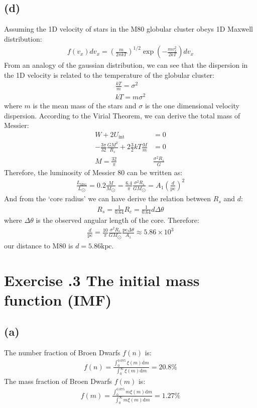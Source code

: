 \documentclass[a4paper,12pt]{article}
\renewcommand{\d}{\mathrm{d}}
\begin{document}
\subsection*{(d)}
Assuming the 1D velocity of stars in the M80 globular cluster obeys 1D Maxwell distribution:
\begin{align*}
    f(v_x)dv_x = (\frac{m}{2\pi kT})^{1/2} \exp(-\frac{m v_x^2}{2kT}) d v_x
\end{align*}
From an analogy of the gaussian distribution, we can see that the dispersion in the 1D velocity 
is related to the temperature of the globular cluster:
\begin{align*}
    \frac{kT}{m} = \sigma^2 \\
    kT = m \sigma^2
\end{align*}
where $m$ is the mean mass of the stars and $\sigma$ is the one dimensional velocity dispersion.
According to the Virial Theorem, we can derive the total mass of Messier:
\begin{align*}
    W + 2 U_{\text{int}} &= 0\\
    -\frac{3\pi}{32} \frac{GM^2}{R_s} + 2 \frac{3}{2} kT \frac{M}{m} &= 0 \\
    M = \frac{32}{\pi} & \frac{\sigma^2 R_s}{G}
\end{align*}
Therefore, the luminosity of Messier 80 can be written as:
\begin{align*}
    \frac{L_{\text{M81}}}{L_{\bigodot}} = 0.2 \frac{M}{M_{\bigodot}} = \frac{6.4}{\pi} \frac{\sigma^2 R_s}{G M_{\bigodot}} =  A_1 (\frac{d}{\text{pc}})^2
\end{align*}
And from the `core radius' we can have derive the relation between $R_s$ and $d$:
\begin{align*}
    R_s = \frac{1}{0.64} R_c = \frac{1}{0.64} d \Delta \theta
\end{align*}
where $\Delta \theta$ is the observed angular length of the core. Therefore:
\begin{align*}
    \frac{d}{\text{pc}} = \frac{10}{\pi} \frac{\sigma^2 R_s}{G M_{\bigodot}} \frac{\text{pc} \Delta \theta}{A_1} \approx 5.86 \times 10^3
\end{align*}
our distance to M80 is $d = 5.86 \text{kpc}$.

\section*{\textbf{Exercise \uppercase\expandafter{}.3  The initial mass function (IMF)}}
\subsection*{(a)}
The number fraction of Broen Dwarfs $f(n)$ is:
\begin{align*}
    f(n) = \frac{\int_{0}^{0.075} \xi(m) \d m}{\int_{0}^{\infty } \xi(m) \d m} = 20.8\%
\end{align*}
The mass fraction of Broen Dwarfs $f(m)$ is:
\begin{align*}
    f(m) = \frac{\int_{0}^{0.075} m \xi(m) \d m}{\int_{0}^{\infty } m \xi(m) \d m} = 1.27\%
\end{align*}
\end{document}
